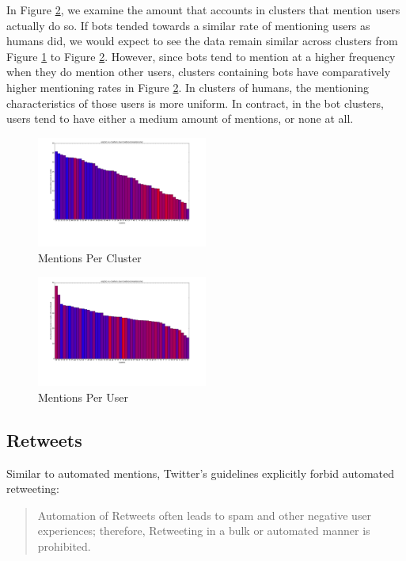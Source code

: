 \documentclass{sig-alternate-05-2015}
\begin{document}
In Figure \ref{fig:ment2}, we examine the amount that accounts in clusters that mention users actually do so. If bots tended towards a similar rate of mentioning users as humans did, we would expect to see the data remain similar across clusters from Figure \ref{fig:ment1} to Figure \ref{fig:ment2}. However, since bots tend to mention at a higher frequency when they do mention other users, clusters containing bots have comparatively higher mentioning rates in Figure \ref{fig:ment2}. In clusters of humans, the mentioning characteristics of those users is more uniform. In contract, in the bot clusters, users tend to have either a medium amount of mentions, or none at all.

\begin{figure}[h!]
	\caption{Mentions Per Cluster}
	\label{fig:ment1}
	\centering
		\includegraphics[width=0.5\textwidth]{imgs/mentionspercluster}
\end{figure}

\begin{figure}[h!]
	\caption{Mentions Per User}
	\label{fig:ment2}
	\centering
		\includegraphics[width=0.5\textwidth]{imgs/mentionsperuserpercluster}
\end{figure}

\subsection{Retweets}

Similar to automated mentions, Twitter's guidelines explicitly forbid automated retweeting:

\begin{quote}Automation of Retweets often leads to spam and other negative user experiences; therefore, Retweeting in a bulk or automated manner is prohibited.\cite{twitter:automation}\end{quote}
\end{document}
